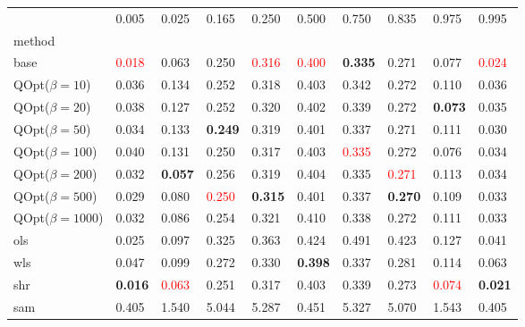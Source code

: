 \begin{tabular}{llllllllll}
\toprule
 & 0.005 & 0.025 & 0.165 & 0.250 & 0.500 & 0.750 & 0.835 & 0.975 & 0.995 \\
method &  &  &  &  &  &  &  &  &  \\
\midrule
base & \textcolor{red}{0.018} & 0.063 & 0.250 & \textcolor{red}{0.316} & \textcolor{red}{0.400} & \textbf{0.335} & 0.271 & 0.077 & \textcolor{red}{0.024} \\
\midrule
QOpt($\beta=10$) & 0.036 & 0.134 & 0.252 & 0.318 & 0.403 & 0.342 & 0.272 & 0.110 & 0.036 \\
QOpt($\beta=20$) & 0.038 & 0.127 & 0.252 & 0.320 & 0.402 & 0.339 & 0.272 & \textbf{0.073} & 0.035 \\
QOpt($\beta=50$) & 0.034 & 0.133 & \textbf{0.249} & 0.319 & 0.401 & 0.337 & 0.271 & 0.111 & 0.030 \\
QOpt($\beta=100$) & 0.040 & 0.131 & 0.250 & 0.317 & 0.403 & \textcolor{red}{0.335} & 0.272 & 0.076 & 0.034 \\
QOpt($\beta=200$) & 0.032 & \textbf{0.057} & 0.256 & 0.319 & 0.404 & 0.335 & \textcolor{red}{0.271} & 0.113 & 0.034 \\
QOpt($\beta=500$) & 0.029 & 0.080 & \textcolor{red}{0.250} & \textbf{0.315} & 0.401 & 0.337 & \textbf{0.270} & 0.109 & 0.033 \\
QOpt($\beta=1000$) & 0.032 & 0.086 & 0.254 & 0.321 & 0.410 & 0.338 & 0.272 & 0.111 & 0.033 \\
\midrule
ols & 0.025 & 0.097 & 0.325 & 0.363 & 0.424 & 0.491 & 0.423 & 0.127 & 0.041 \\
wls & 0.047 & 0.099 & 0.272 & 0.330 & \textbf{0.398} & 0.337 & 0.281 & 0.114 & 0.063 \\
shr & \textbf{0.016} & \textcolor{red}{0.063} & 0.251 & 0.317 & 0.403 & 0.339 & 0.273 & \textcolor{red}{0.074} & \textbf{0.021} \\
sam & 0.405 & 1.540 & 5.044 & 5.287 & 0.451 & 5.327 & 5.070 & 1.543 & 0.405 \\
\bottomrule
\end{tabular}